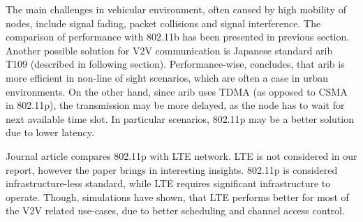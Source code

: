 % 
The main challenges in vehicular environment, often caused by high mobility of nodes, include signal fading, packet collisions and signal interference. The comparison of performance with 802.11b has been presented in previous section. Another possible solution for V2V communication is Japanese standard \acrshort{arib} T109 (described in following section). Performance-wise, \cite{Heinovski2016PerformanceSTD-T109} concludes, that \acrshort{arib} is more efficient in non-line of sight scenarios, which are often a case in urban environments. On the other hand, since \acrshort{arib} uses \acrshort{TDMA} (as opposed to CSMA in 802.11p), the transmission may be more delayed, as the node has to wait for next available time slot. In particular scenarios, 802.11p may be a better solution due to lower latency.\par
% 
Journal article \cite{HameedMir2014LTEEvaluation} compares 802.11p with \acrshort{LTE} network. \acrshort{LTE} is not considered in our report, however the paper brings in interesting insights. 802.11p is considered infrastructure-less standard, while \acrshort{LTE} requires significant infrastructure to operate. Though, simulations have shown, that \acrshort{LTE} performs better for most of the V2V related use-cases, due to better scheduling and channel access control.\par
\pagebreak